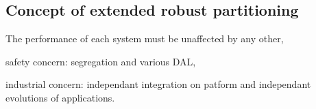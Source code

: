 \documentclass[10pt]{article}
\theoremstyle{plain}
\theoremstyle{definition}
\theoremstyle{remark}
\begin{document}
\subsection{Concept of extended robust partitioning}
The performance of each system must be unaffected by any other,
\begin{compactitem}
	\item safety concern: segregation and various DAL,
	\item industrial concern: independant integration on patform and independant
		evolutions of applications.
\end{compactitem}
\end{document}
